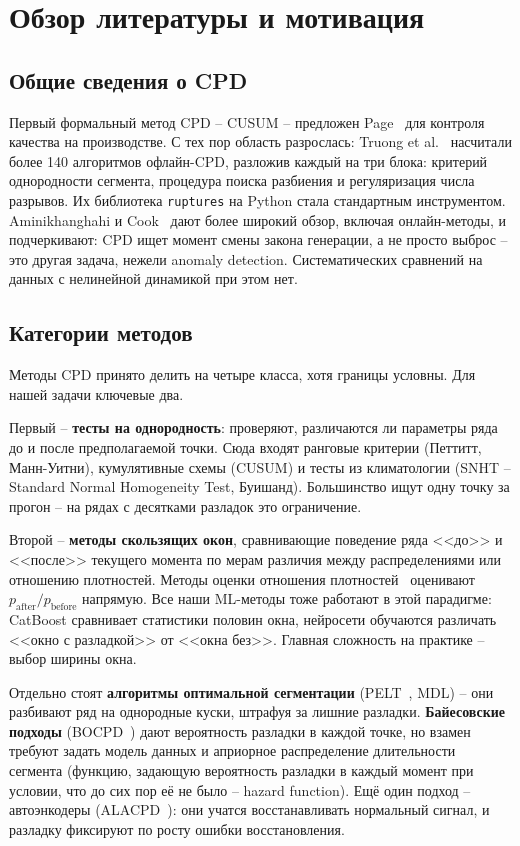 \documentclass[12pt,a4paper]{article}
\begin{document}
\section{Обзор литературы и мотивация}

\subsection{Общие сведения о CPD}

Первый формальный метод CPD  -- CUSUM  -- предложен Page~\cite{page1954} для контроля качества на производстве. С тех пор область разрослась: Truong et al.~\cite{truong2020} насчитали более 140 алгоритмов офлайн-CPD, разложив каждый на три блока: критерий однородности сегмента, процедура поиска разбиения и регуляризация числа разрывов. Их библиотека \texttt{ruptures} на Python стала стандартным инструментом. Aminikhanghahi и Cook~\cite{aminikhanghahi2017} дают более широкий обзор, включая онлайн-методы, и подчеркивают: CPD ищет момент смены закона генерации, а не просто выброс  -- это другая задача, нежели anomaly detection. Систематических сравнений на данных с нелинейной динамикой при этом нет.

\subsection{Категории методов}

Методы CPD принято делить на четыре класса, хотя границы условны. Для нашей задачи ключевые два.

Первый  -- \textbf{тесты на однородность}: проверяют, различаются ли параметры ряда до и после предполагаемой точки. Сюда входят ранговые критерии (Петтитт, Манн-Уитни), кумулятивные схемы (CUSUM) и тесты из климатологии (SNHT  -- Standard Normal Homogeneity Test, Буишанд). Большинство ищут одну точку за прогон  -- на рядах с десятками разладок это ограничение.

Второй  -- \textbf{методы скользящих окон}, сравнивающие поведение ряда <<до>> и <<после>> текущего момента по мерам различия между распределениями или отношению плотностей. Методы оценки отношения плотностей~\cite{liu2013} оценивают $p_{\text{after}}/p_{\text{before}}$ напрямую. Все наши ML-методы тоже работают в этой парадигме: CatBoost сравнивает статистики половин окна, нейросети обучаются различать <<окно с разладкой>> от <<окна без>>. Главная сложность на практике  -- выбор ширины окна.

Отдельно стоят \textbf{алгоритмы оптимальной сегментации} (PELT~\cite{killick2012}, MDL)  -- они разбивают ряд на однородные куски, штрафуя за лишние разладки. \textbf{Байесовские подходы} (BOCPD~\cite{adams2007}) дают вероятность разладки в каждой точке, но взамен требуют задать модель данных и априорное распределение длительности сегмента (функцию, задающую вероятность разладки в каждый момент при условии, что до сих пор её не было -- hazard function). Ещё один подход  -- автоэнкодеры (ALACPD~\cite{atashgahi2022}): они учатся восстанавливать нормальный сигнал, и разладку фиксируют по росту ошибки восстановления.
\end{document}
